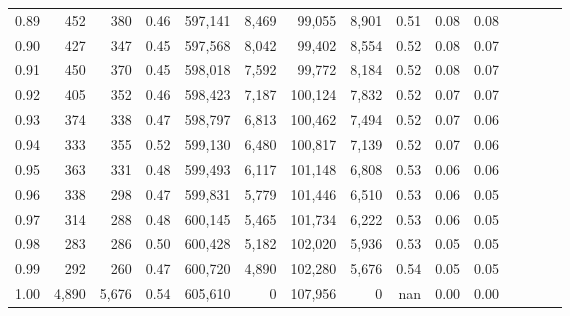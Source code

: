 \begin{tabular}{rrrcrrrrrrrrrrr}
0.89 &     452 &    380 &                                       0.46 &  597,141 &    8,469 &   99,055 &    8,901 &  0.51 &  0.08 &                         0.08 \\
0.90 &     427 &    347 &                                       0.45 &  597,568 &    8,042 &   99,402 &    8,554 &  0.52 &  0.08 &                         0.07 \\
0.91 &     450 &    370 &                                       0.45 &  598,018 &    7,592 &   99,772 &    8,184 &  0.52 &  0.08 &                         0.07 \\
0.92 &     405 &    352 &                                       0.46 &  598,423 &    7,187 &  100,124 &    7,832 &  0.52 &  0.07 &                         0.07 \\
0.93 &     374 &    338 &                                       0.47 &  598,797 &    6,813 &  100,462 &    7,494 &  0.52 &  0.07 &                         0.06 \\
0.94 &     333 &    355 &                                       0.52 &  599,130 &    6,480 &  100,817 &    7,139 &  0.52 &  0.07 &                         0.06 \\
0.95 &     363 &    331 &                                       0.48 &  599,493 &    6,117 &  101,148 &    6,808 &  0.53 &  0.06 &                         0.06 \\
0.96 &     338 &    298 &                                       0.47 &  599,831 &    5,779 &  101,446 &    6,510 &  0.53 &  0.06 &                         0.05 \\
0.97 &     314 &    288 &                                       0.48 &  600,145 &    5,465 &  101,734 &    6,222 &  0.53 &  0.06 &                         0.05 \\
0.98 &     283 &    286 &                                       0.50 &  600,428 &    5,182 &  102,020 &    5,936 &  0.53 &  0.05 &                         0.05 \\
0.99 &     292 &    260 &                                       0.47 &  600,720 &    4,890 &  102,280 &    5,676 &  0.54 &  0.05 &                         0.05 \\
1.00 &   4,890 &  5,676 &                                       0.54 &  605,610 &        0 &  107,956 &        0 &   nan &  0.00 &                         0.00 \\
\bottomrule
\end{tabular}
